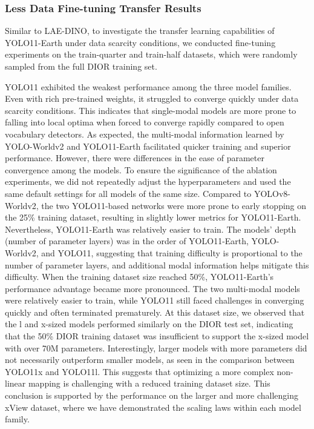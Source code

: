 \documentclass{article}
\begin{document}
\subsubsection{Less Data Fine-tuning Transfer Results}
Similar to LAE-DINO, to investigate the transfer learning capabilities of YOLO11-Earth under data scarcity 
conditions, we conducted fine-tuning experiments on the train-quarter and train-half datasets, which were 
randomly sampled from the full DIOR training set. 

YOLO11 exhibited the weakest performance among the three model families. Even with rich pre-trained weights, 
it struggled to converge quickly under data scarcity conditions. This indicates that single-modal models are 
more prone to falling into local optima when forced to converge rapidly compared to open vocabulary detectors. 
As expected, the multi-modal information learned by YOLO-Worldv2 and YOLO11-Earth facilitated quicker training 
and superior performance. However, there were differences in the ease of parameter convergence among the models. 
To ensure the significance of the ablation experiments, we did not repeatedly adjust the hyperparameters and 
used the same default settings for all models of the same size. Compared to YOLOv8-Worldv2, the two YOLO11-based 
networks were more prone to early stopping on the 25\% training dataset, resulting in slightly lower metrics for 
YOLO11-Earth. Nevertheless, YOLO11-Earth was relatively easier to train. The models' depth (number of parameter 
layers) was in the order of YOLO11-Earth, YOLO-Worldv2, and YOLO11, suggesting that training difficulty is 
proportional to the number of parameter layers, and additional modal information helps mitigate this difficulty.
When the training dataset size reached 50\%, YOLO11-Earth's performance advantage became more pronounced. 
The two multi-modal models were relatively easier to train, while YOLO11 still faced challenges in converging 
quickly and often terminated prematurely. At this dataset size, we observed that the l and x-sized models 
performed similarly on the DIOR test set, indicating that the 50\% DIOR training dataset was insufficient to 
support the x-sized model with over 70M parameters. Interestingly, larger models with more parameters did not 
necessarily outperform smaller models, as seen in the comparison between YOLO11x and YOLO11l. This suggests 
that optimizing a more complex non-linear mapping is challenging with a reduced training dataset size. This 
conclusion is supported by the performance on the larger and more challenging xView dataset, where we have 
demonstrated the scaling laws within each model family.
\end{document}
